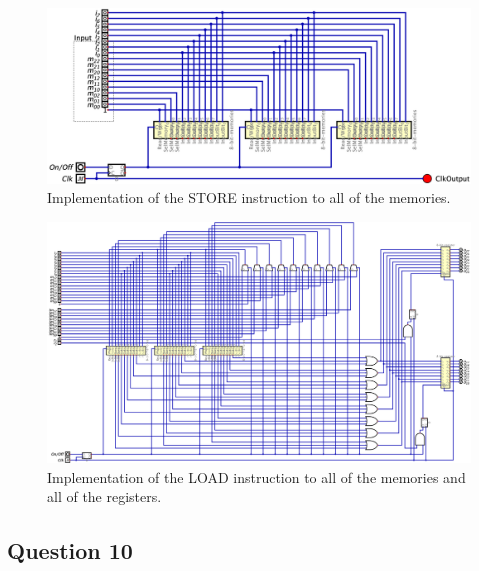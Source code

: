 \documentclass[conference]{IEEEtran}
\begin{document}
\begin{figure}[h!]
    \centering
    \includegraphics[width=\textwidth]{assets/store.png}
    \caption{Implementation of the STORE instruction to all of the memories.}
    \label{fig:store_3memories}
\end{figure}

\begin{figure}[h!]
    \centering
    \includegraphics[width=\textwidth]{assets/load+store+3+2.png}
    \caption{Implementation of the LOAD instruction to all of the memories and all of the registers.}
    \label{fig:load+store+3+2}
\end{figure}


\subsection{Question 10}
\end{document}
